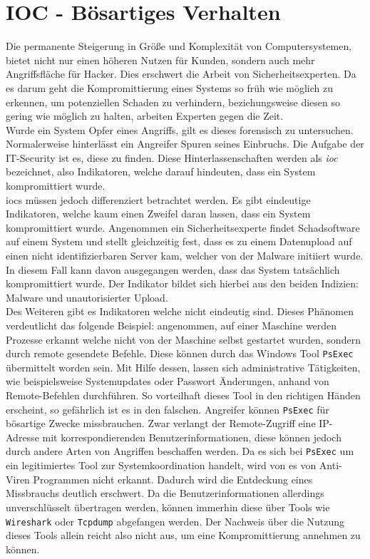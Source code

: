 \documentclass[
    12pt, %
    DIV10,
    ngerman, %
    a4paper, %
    oneside, %
    titlepage, %
    parskip=half, %
    headings=normal, %
    listof=totoc, %
    bibliography=totoc, %
    index=totoc, %
    captions=tableheading, %
    final %
]{scrreprt}
\begin{document}
\chapter{IOC - Bösartiges Verhalten}\label{sec:ioc}
Die permanente Steigerung in Größe und Komplexität von Computersystemen, bietet nicht nur einen höheren Nutzen für Kunden, sondern auch mehr Angriffsfläche für Hacker. Dies erschwert die Arbeit von Sicherheitsexperten. Da es darum geht die Kompromittierung eines Systems so früh wie möglich zu erkennen, um potenziellen Schaden zu verhindern, beziehungsweise diesen so gering wie möglich zu halten, arbeiten Experten gegen die Zeit.\\
Wurde ein System Opfer eines Angriffs, gilt es dieses forensisch zu untersuchen. Normalerweise hinterlässt ein Angreifer Spuren seines Einbruchs. Die Aufgabe der IT-Security ist es, diese zu finden. Diese Hinterlassenschaften werden als \emph{\acf{ioc}} bezeichnet, also Indikatoren, welche darauf hindeuten, dass ein System kompromittiert wurde.\\
%
\ac{iocs} müssen jedoch differenziert betrachtet werden. Es gibt eindeutige Indikatoren, welche kaum einen Zweifel daran lassen, dass ein System kompromittiert wurde. Angenommen ein Sicherheitsexperte findet Schadsoftware auf einem System und stellt gleichzeitig fest, dass es zu einem Datenupload auf einen nicht identifizierbaren Server kam, welcher von der Malware initiiert wurde. In diesem Fall kann davon ausgegangen werden, dass das System tatsächlich kompromittiert wurde. Der Indikator bildet sich hierbei aus den beiden Indizien: Malware und unautorisierter Upload.\\
Des Weiteren gibt es Indikatoren welche nicht eindeutig sind. Dieses Phänomen verdeutlicht das folgende Beispiel: angenommen, auf einer Maschine werden Prozesse erkannt welche nicht von der Maschine selbst gestartet wurden, sondern durch remote gesendete Befehle. Diese können durch das Windows Tool \texttt{PsExec} übermittelt worden sein. Mit Hilfe dessen, lassen sich administrative Tätigkeiten, wie beispielsweise Systemupdates oder Passwort Änderungen, anhand von Remote-Befehlen durchführen. So vorteilhaft dieses Tool in den richtigen Händen erscheint, so gefährlich ist es in den falschen. Angreifer können \texttt{PsExec} für bösartige Zwecke missbrauchen. Zwar verlangt der Remote-Zugriff eine IP-Adresse mit korrespondierenden Benutzerinformationen, diese können jedoch durch andere Arten von Angriffen beschaffen werden. Da es sich bei \texttt{PsExec} um ein legitimiertes Tool zur Systemkoordination handelt, wird von es von Anti-Viren Programmen nicht erkannt. Dadurch wird die Entdeckung eines Missbrauchs deutlich erschwert. Da die Benutzerinformationen allerdings unverschlüsselt übertragen werden, können immerhin diese über Tools wie \texttt{Wireshark} oder \texttt{Tcpdump} abgefangen werden. Der Nachweis über die Nutzung dieses Tools allein reicht also nicht aus, um eine Kompromittierung annehmen zu können.
\end{document}
